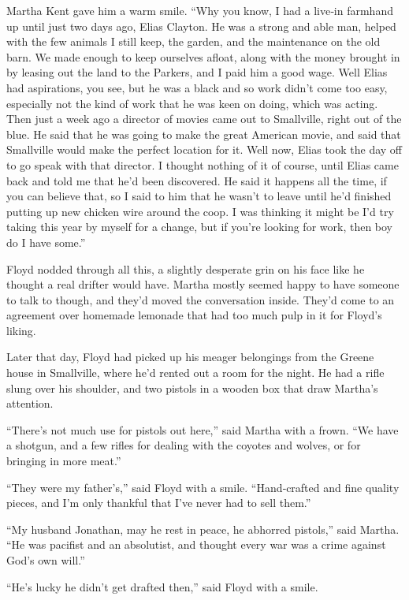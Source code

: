 \documentclass[ebook,12pt]{memoir}
\begin{document}
Martha Kent gave him a warm smile. ``Why you know, I had a live‐in
farmhand up until just two days ago, Elias Clayton. He was a strong and
able man, helped with the few animals I still keep, the garden, and the
maintenance on the old barn. We made enough to keep ourselves afloat,
along with the money brought in by leasing out the land to the Parkers,
and I paid him a good wage. Well Elias had aspirations, you see, but he
was a black and so work didn't come too easy, especially not the kind of
work that he was keen on doing, which was acting. Then just a week ago a
director of movies came out to Smallville, right out of the blue. He
said that he was going to make the great American movie, and said that
Smallville would make the perfect location for it. Well now, Elias took
the day off to go speak with that director. I thought nothing of it of
course, until Elias came back and told me that he'd been discovered. He
said it happens all the time, if you can believe that, so I said to him
that he wasn't to leave until he'd finished putting up new chicken wire
around the coop. I was thinking it might be I'd try taking this year by
myself for a change, but if you're looking for work, then boy do I have
some.''

Floyd nodded through all this, a slightly desperate grin on his face
like he thought a real drifter would have. Martha mostly seemed happy to
have someone to talk to though, and they'd moved the conversation
inside. They'd come to an agreement over homemade lemonade that had too
much pulp in it for Floyd's liking.

Later that day, Floyd had picked up his meager belongings from the
Greene house in Smallville, where he'd rented out a room for the night.
He had a rifle slung over his shoulder, and two pistols in a wooden box
that draw Martha's attention.

``There's not much use for pistols out here,'' said Martha with a frown.
``We have a shotgun, and a few rifles for dealing with the coyotes and
wolves, or for bringing in more meat.''

``They were my father's,'' said Floyd with a smile. ``Hand‐crafted and
fine quality pieces, and I'm only thankful that I've never had to sell
them.''

``My husband Jonathan, may he rest in peace, he abhorred pistols,'' said
Martha. ``He was pacifist and an absolutist, and thought every war was a
crime against God's own will.''

``He's lucky he didn't get drafted then,'' said Floyd with a smile.
\end{document}
